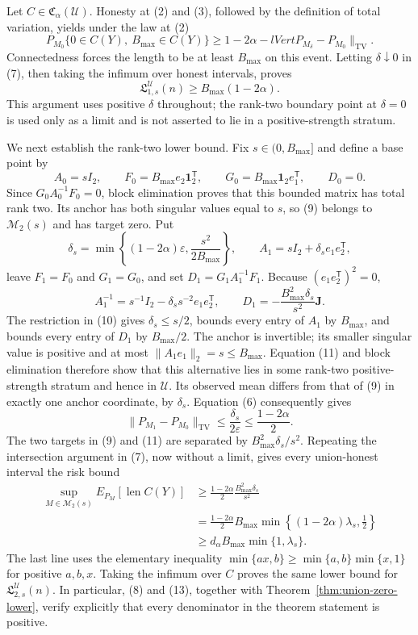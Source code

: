 Let \(C\in\mathfrak C_\alpha(\mathcal U)\).  Honesty at (2) and (3), followed by the definition of total variation, yields under the law at (2)
\[
 P_{M_0}\{0\in C(Y),\ B_{\max}\in C(Y)\}
 \geq1-2\alpha-lVert P_{M_\delta}-P_{M_0}\rVert_{\mathrm{TV}}.
\tag{7}
\]
Connectedness forces the length to be at least \(B_{\max}\) on this event.  Letting \(\delta\downarrow0\) in (7), then taking the infimum over honest intervals, proves
\[
 \mathfrak L_{1,s}^{\mathcal U}(n)\geq B_{\max}(1-2\alpha).
\tag{8}
\]
This argument uses positive \(\delta\) throughout; the rank-two boundary point at \(\delta=0\) is used only as a limit and is not asserted to lie in a positive-strength stratum.

We next establish the rank-two lower bound.  Fix \(s\in(0,B_{\max}]\) and define a base point by
\[
 A_0=sI_2,\qquad
 F_0=B_{\max}e_2\mathbf1_2^{\mathsf T},\qquad
 G_0=B_{\max}\mathbf1_2e_1^{\mathsf T},\qquad
 D_0=0.
\tag{9}
\]
Since \(G_0A_0^{-1}F_0=0\), block elimination proves that this bounded matrix has total rank two.  Its anchor has both singular values equal to \(s\), so (9) belongs to \(\mathcal M_2(s)\) and has target zero.  Put
\[
 \delta_s=\min\left\{(1-2\alpha)\varepsilon,
 \frac{s^2}{2B_{\max}}\right\},
 \qquad
 A_1=sI_2+\delta_s e_1e_2^{\mathsf T},
\tag{10}
\]
leave \(F_1=F_0\) and \(G_1=G_0\), and set \(D_1=G_1A_1^{-1}F_1\).  Because \((e_1e_2^{\mathsf T})^2=0\),
\[
 A_1^{-1}=s^{-1}I_2-\delta_ss^{-2}e_1e_2^{\mathsf T},
 \qquad
 D_1=-\frac{B_{\max}^2\delta_s}{s^2}\mathbf J.
\tag{11}
\]
The restriction in (10) gives \(\delta_s\leq s/2\), bounds every entry of \(A_1\) by \(B_{\max}\), and bounds every entry of \(D_1\) by \(B_{\max}/2\).  The anchor is invertible; its smaller singular value is positive and at most \(\lVert A_1e_1\rVert_2=s\leq B_{\max}\).  Equation (11) and block elimination therefore show that this alternative lies in some rank-two positive-strength stratum and hence in \(\mathcal U\).  Its observed mean differs from that of (9) in exactly one anchor coordinate, by \(\delta_s\).  Equation (6) consequently gives
\[
 \lVert P_{M_1}-P_{M_0}\rVert_{\mathrm{TV}}
 \leq\frac{\delta_s}{2\varepsilon}
 \leq\frac{1-2\alpha}{2}.
\tag{12}
\]
The two targets in (9) and (11) are separated by \(B_{\max}^2\delta_s/s^2\).  Repeating the intersection argument in (7), now without a limit, gives every union-honest interval the risk bound
\[
 \begin{split}
 \sup_{M\in\mathcal M_2(s)}E_{P_M}[\operatorname{len}C(Y)]
 &\geq\frac{1-2\alpha}{2}\frac{B_{\max}^2\delta_s}{s^2}\\
 &=\frac{1-2\alpha}{2}B_{\max}
 \min\left\{(1-2\alpha)\lambda_s,\frac12\right\}\\
 &\geq d_\alpha B_{\max}\min\{1,\lambda_s\}.
 \end{split}
\tag{13}
\]
The last line uses the elementary inequality
\(\min\{ax,b\}\geq\min\{a,b\}\min\{x,1\}\) for positive \(a,b,x\).  Taking the infimum over \(C\) proves the same lower bound for \(\mathfrak L_{2,s}^{\mathcal U}(n)\).  In particular, (8) and (13), together with Theorem~\ref{thm:union-zero-lower}, verify explicitly that every denominator in the theorem statement is positive.

